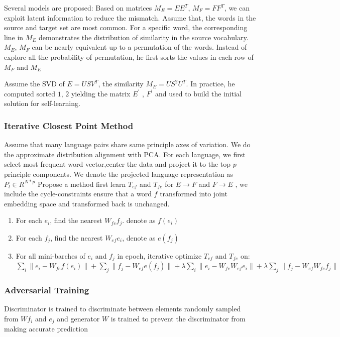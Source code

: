 	Several models are proposed:
	Based on matrices ${M_E = EE^T}$, ${M_F = FF^T}$, we can exploit latent information to reduce the mismatch. Assume that, the words in the source and target set are most common. For a specific word, the corresponding line in ${M_E}$ demonstrates the distribution of similarity in the source vocabulary. ${M_E}$, ${M_F}$ can be nearly equivalent up to a permutation of the words. 
	Instead of explore all the probability of permutation, he first sorts the values in each row of ${M_F}$ and ${M_E}$
	
	Assume the SVD of ${E = USV^T}$,  the similarity ${M_E = US^2U^T}$. In practice, he computed sorted ${1}$, ${2}$	yielding the matrix ${E^{\prime}}$ , ${F^{\prime}}$ and used to build the initial solution for self-learning.
	\subsubsection{Iterative Closest Point Method}
	Assume that many language pairs share same principle axes of variation. We do the approximate distribution alignment with PCA.
	For each language, we first select most frequent word vector,center the data and project it to the top ${p}$ principle components. We denote the projected language representation as 	${P_l \in {R}^{N * p}}$
	Propose a method first learn ${T_{ef}}$ and ${T_{fe}}$ for ${E \rightarrow F}$ and ${F \rightarrow E}$ , we include the cycle-constraints ensure that a word ${f}$ transformed into joint embedding space and transformed back is unchanged. 
	
	
	\begin{enumerate}
		\item For each ${e_i}$, find the nearest ${W_{fe} f_j}$.  denote as ${f(e_i)}$
		\item For each ${f_j}$, find the nearest ${W_{ef} e_i}$, denote as ${e(f_j)}$
		\item For all mini-barches of ${e_i}$ and ${f_j}$ in epoch, iterative optimize ${T_{ef}}$ and ${T_{fe}}$ on: \\
		${ \sum_{i} {\lVert e_i - W_{fe} f(e_i)\rVert} + \sum_j {\rVert f_j - W_{ef} e(f_j)\rVert} + \lambda {\sum_i}{\lVert e_i- W_{fe} W_{ef} e_i \rVert}  +  \lambda \sum_j {\lVert f_j - W_{ef} W_{fe} f_j \rVert}}$
	\end{enumerate}
	\subsubsection{Adversarial Training} 
	Discriminator is trained to discriminate between elements randomly sampled from ${Wf_i}$ and ${e_j}$ and generator ${W}$ is trained to prevent the discriminator from making accurate prediction\\
	
